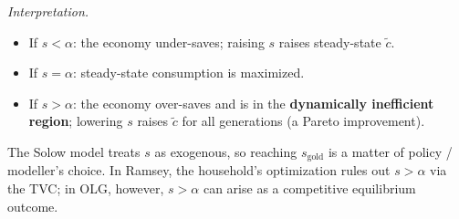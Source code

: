 \begin{tcolorbox}[
    colback=blue!1!white,
    colframe=blue!40!white,
    title=Derivation of the optimal savings rate in the Solow model,
    fonttitle=\bfseries
    ]
\textit{Interpretation.}
\begin{itemize}
    \item If $s < \alpha$: the economy under-saves; raising $s$ raises steady-state $\tilde c$.
    \item If $s = \alpha$: steady-state consumption is maximized.
    \item If $s > \alpha$: the economy over-saves and is in the \textbf{dynamically inefficient region}; lowering $s$ raises $\tilde c$ for all generations (a Pareto improvement).
\end{itemize}
The Solow model treats $s$ as exogenous, so reaching $s_{\text{gold}}$ is a matter of policy / modeller's choice. In Ramsey, the household's optimization rules out $s > \alpha$ via the TVC; in OLG, however, $s > \alpha$ can arise as a competitive equilibrium outcome.
\end{tcolorbox}
